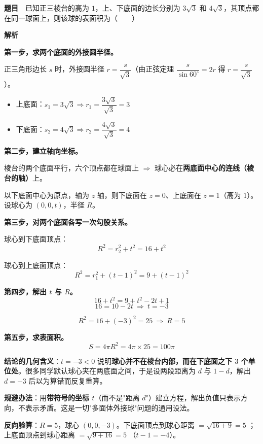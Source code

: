 \par\medskip


\textbf{题目}　已知正三棱台的高为 $1$，上、下底面的边长分别为 $3\sqrt3$ 和 $4\sqrt3$，其顶点都在同一球面上，则该球的表面积为（　　）

\textbf{解析}

\textbf{第一步，求两个底面的外接圆半径。}

正三角形边长 $s$ 时，外接圆半径 $r=\dfrac s{\sqrt3}$（由正弦定理 $\dfrac s{\sin60^\circ}=2r$ 得 $r=\dfrac s{\sqrt3}$）。

\begin{itemize}
\item 上底面：$s_1=3\sqrt3\Rightarrow r_1=\dfrac{3\sqrt3}{\sqrt3}=3$
\item 下底面：$s_2=4\sqrt3\Rightarrow r_2=\dfrac{4\sqrt3}{\sqrt3}=4$
\end{itemize}

\textbf{第二步，建立轴向坐标。}

棱台的两个底面平行，六个顶点都在球面上 $\Rightarrow$ 球心必在\textbf{两底面中心的连线（棱台的轴）}上。

以下底面中心为原点，轴为 $z$ 轴，则下底面在 $z=0$、上底面在 $z=1$（高为 $1$）。设球心为 $(0,0,t)$，半径 $R$。

\textbf{第三步，对两个底面各写一次勾股关系。}

球心到下底面顶点：
\[R^{2}=r_2^{2}+t^{2}=16+t^{2}\]

球心到上底面顶点：
\[R^{2}=r_1^{2}+(t-1)^{2}=9+(t-1)^{2}\]

\textbf{第四步，解出 $t$ 与 $R$。}
\[16+t^{2}=9+t^{2}-2t+1\]
\[16=10-2t\ \Longrightarrow\ t=-3\]

\[R^{2}=16+(-3)^{2}=25\ \Longrightarrow\ R=5\]

\textbf{第五步，求表面积。}
\[S=4\pi R^{2}=4\pi\times25=100\pi\]


\begin{gktip}
\textbf{结论的几何含义}：$t=-3<0$ 说明\textbf{球心并不在棱台内部，而在下底面之下 $3$ 个单位处}。很多同学默认球心夹在两底面之间，于是设两段距离为 $d$ 与 $1-d$，解出 $d=-3$ 后以为算错而反复重算。

\textbf{规避办法}：用\textbf{带符号的坐标 $t$}（而不是"距离 $d$"）建立方程，解出负值只表示方向，不表示矛盾。这是一切"多面体外接球"问题的通用设法。

\textbf{反向验算}：$R=5$，球心 $(0,0,-3)$。下底面顶点到球心距离 $=\sqrt{16+9}=5$ ；上底面顶点到球心距离 $=\sqrt{9+16}=5$ （$t-1=-4$）。
\end{gktip}

